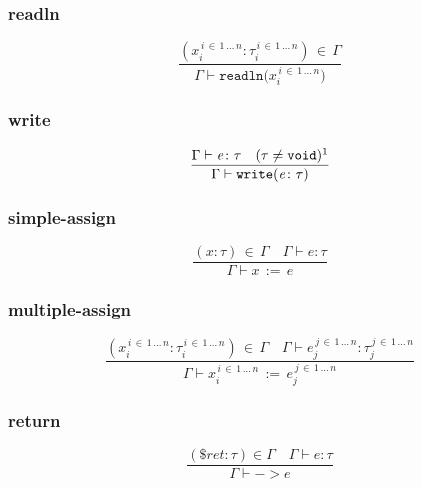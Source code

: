 \documentclass[a4paper,12pt]{article}
\newcommand\resw[1]{\mathtt{#1}}
\newcommand\mi[1]{\mathit{#1}}
\begin{document}
	\subsubsection{readln}
	\[
		\frac{(x_{i}^{\, i \, \in \, 1 \, \dots \, n} \colon \tau_{i}^{\, i \, \in \, 1 \, \dots \, n}) \, \in \, \Gamma}%
		{\Gamma \vdash \resw{readln(} \mi{x}_{i}^{\, i \, \in \, 1 \, \dots \, n} \resw{)}}
	\]
    \subsubsection{write}
    \[
        \frac{\Gamma \vdash \mi{e} \colon \tau \quad (\tau \neq \resw{void})\footnotemark}%
        {\Gamma \vdash \resw{write(} \mi{e} \colon \tau \resw{)}}
    \]
    \subsubsection{simple-assign}
    \[
        \frac{(\mi{x} \colon \tau) \, \in \, \Gamma \quad \Gamma \vdash \mi{e} \colon \tau}%
        {\Gamma \vdash \mi{x} \, \resw{:=} \, \mi{e}}
    \]
    \subsubsection{multiple-assign}
     \[
        \frac{(\mi{x}_{i}^{\, i \, \in \, 1 \, \dots \, n} \colon \tau_{i}^{\, i \, \in \, 1 \, \dots \, n}) \, \in \, \Gamma \quad \Gamma \vdash \mi{e}_{j}^{\, j \, \in \, 1 \, \dots \, n}%
        \colon \tau_{j}^{\, j \, \in \, 1 \, \dots \, n}}%
        {\Gamma \vdash \mi{x}_{i}^{\, i \, \in \, 1 \, \dots \, n} \, \resw{:=} \, \mi{e}_{j}^{\, j \, \in \, 1 \, \dots \, n}}
    \]
    \subsubsection{return}
    \[
    	\frac{(\$\mi{ret} \colon \tau) \in \Gamma \quad \Gamma \vdash \mi{e} \colon \tau}%
	{\Gamma \vdash \resw{-\!\!>} \mi{e}}
    \]
\end{document}
